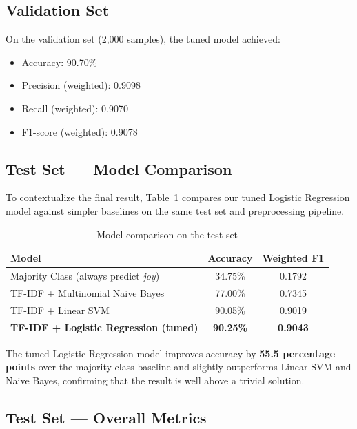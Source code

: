 \documentclass[12pt]{article}
\begin{document}
\subsection{Validation Set}

On the validation set (2{,}000 samples), the tuned model achieved:
\begin{itemize}
    \item Accuracy: 90.70\%
    \item Precision (weighted): 0.9098
    \item Recall (weighted): 0.9070
    \item F1-score (weighted): 0.9078
\end{itemize}

\subsection{Test Set --- Model Comparison}

To contextualize the final result, Table~\ref{tab:baselines} compares our tuned Logistic Regression model against simpler baselines on the same test set and preprocessing pipeline.

\begin{table}[H]
\centering
\caption{Model comparison on the test set}
\label{tab:baselines}
\begin{tabular}{lcc}
\toprule
\textbf{Model} & \textbf{Accuracy} & \textbf{Weighted F1} \\
\midrule
Majority Class (always predict \textit{joy}) & 34.75\% & 0.1792 \\
TF-IDF + Multinomial Naive Bayes & 77.00\% & 0.7345 \\
TF-IDF + Linear SVM & 90.05\% & 0.9019 \\
\textbf{TF-IDF + Logistic Regression (tuned)} & \textbf{90.25\%} & \textbf{0.9043} \\
\bottomrule
\end{tabular}
\end{table}

The tuned Logistic Regression model improves accuracy by \textbf{55.5 percentage points} over the majority-class baseline and slightly outperforms Linear SVM and Naive Bayes, confirming that the result is well above a trivial solution.

\subsection{Test Set --- Overall Metrics}
\end{document}
